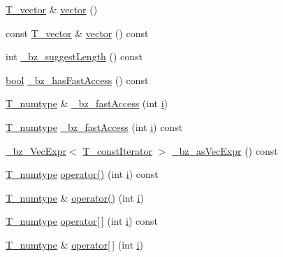\begin{DoxyCompactItemize}
\item 
\hyperlink{classVectorPick_ad84fb47502945888eb8854b1460e493b}{T\+\_\+vector} \& \hyperlink{classVectorPick_ada686dd18fcd948bc70673f5aa8e9e14}{vector} ()
\item 
const \hyperlink{classVectorPick_ad84fb47502945888eb8854b1460e493b}{T\+\_\+vector} \& \hyperlink{classVectorPick_aafe5a26735cd9dea9bdfe08190319d4a}{vector} () const 
\item 
int \hyperlink{classVectorPick_afe4110178a782d9c2f908a040e31cb8e}{\+\_\+bz\+\_\+suggest\+Length} () const 
\item 
\hyperlink{compiler_8h_abb452686968e48b67397da5f97445f5b}{bool} \hyperlink{classVectorPick_aef1659199769ad33c74496309411d206}{\+\_\+bz\+\_\+has\+Fast\+Access} () const 
\item 
\hyperlink{classVectorPick_a8e830396ccfaea2b85a2a442f45fca35}{T\+\_\+numtype} \& \hyperlink{classVectorPick_a03935b8c4a109cb0ea18474bcc1b98cd}{\+\_\+bz\+\_\+fast\+Access} (int \hyperlink{indexexpr_8h_aabd77643995707c185e95c8cb2782c81}{i})
\item 
\hyperlink{classVectorPick_a8e830396ccfaea2b85a2a442f45fca35}{T\+\_\+numtype} \hyperlink{classVectorPick_ac0818825b97a1e9344cf6e9ed09b98c5}{\+\_\+bz\+\_\+fast\+Access} (int \hyperlink{indexexpr_8h_aabd77643995707c185e95c8cb2782c81}{i}) const 
\item 
\hyperlink{class__bz__VecExpr}{\+\_\+bz\+\_\+\+Vec\+Expr}$<$ \hyperlink{classVectorPick_a5c6029ef4573adb719b497be94ce2a57}{T\+\_\+const\+Iterator} $>$ \hyperlink{classVectorPick_afd6606f86ae883542434f7c772e26de1}{\+\_\+bz\+\_\+as\+Vec\+Expr} () const 
\item 
\hyperlink{classVectorPick_a8e830396ccfaea2b85a2a442f45fca35}{T\+\_\+numtype} \hyperlink{classVectorPick_ae7f56f2d51de42241fb793932a383b7b}{operator()} (int \hyperlink{indexexpr_8h_aabd77643995707c185e95c8cb2782c81}{i}) const 
\item 
\hyperlink{classVectorPick_a8e830396ccfaea2b85a2a442f45fca35}{T\+\_\+numtype} \& \hyperlink{classVectorPick_abbd4a26d326c094cf7d3dbf7b597ef2b}{operator()} (int \hyperlink{indexexpr_8h_aabd77643995707c185e95c8cb2782c81}{i})
\item 
\hyperlink{classVectorPick_a8e830396ccfaea2b85a2a442f45fca35}{T\+\_\+numtype} \hyperlink{classVectorPick_a0f45701e9d69fc993f6a325cfb928967}{operator\mbox{[}$\,$\mbox{]}} (int \hyperlink{indexexpr_8h_aabd77643995707c185e95c8cb2782c81}{i}) const 
\item 
\hyperlink{classVectorPick_a8e830396ccfaea2b85a2a442f45fca35}{T\+\_\+numtype} \& \hyperlink{classVectorPick_a2872c1cc39f87635a42d4f16343e9507}{operator\mbox{[}$\,$\mbox{]}} (int \hyperlink{indexexpr_8h_aabd77643995707c185e95c8cb2782c81}{i})

\end{DoxyCompactItemize}
